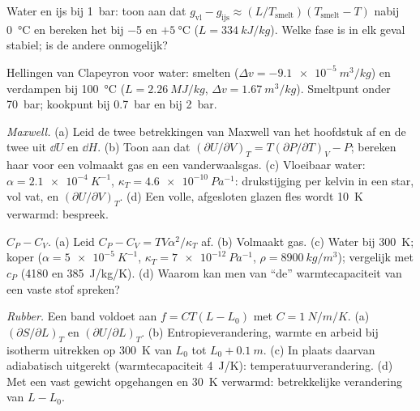 \begin{exercise}[$\star$]\label{exo:b2:thermodynamic-potentials:3}
Water en ijs bij \qty{1}{bar}: toon aan dat
$g_{\text{vl}} - g_{\text{ijs}} \approx
(L/T_{\text{smelt}})(T_{\text{smelt}} - T)$
nabij \qty{0}{\celsius} en bereken het
bij \qty{-5}{} en $+\qty{5}{\celsius}$ ($L = \qty{334}{kJ/kg}$). Welke fase is
in elk geval stabiel; is de andere onmogelijk?
\end{exercise}

\begin{exercise}[$\star$]\label{exo:b2:thermodynamic-potentials:4}
Hellingen van Clapeyron voor water: smelten ($\Delta v = -\qty{9.1e-5}{m^3/kg}$) en
verdampen bij \qty{100}{\celsius} ($L = \qty{2.26}{MJ/kg}$,
$\Delta v =
\qty{1.67}{m^3/kg}$). Smeltpunt onder \qty{70}{bar}; kookpunt
bij
\qty{0.7}{bar} en bij \qty{2}{bar}.
\end{exercise}

\begin{exercise}[$\star\star$]\label{exo:b2:thermodynamic-potentials:5}
\emph{Maxwell.} (a) Leid de twee betrekkingen van Maxwell van het hoofdstuk
af en de twee uit $\dd U$ en $\dd H$. (b) Toon aan dat
$(\partial U/\partial V)_T =
T(\partial P/\partial T)_V - P$; bereken haar
voor een volmaakt gas en een
vanderwaalsgas. (c) Vloeibaar water: $\alpha = \qty{2.1e-4}{K^{-1}}$,
$\kappa_T =
\qty{4.6e-10}{Pa^{-1}}$: drukstijging per kelvin in een star,
vol vat,
en $(\partial U/\partial V)_T$. (d) Een volle, afgesloten glazen fles wordt
\qty{10}{K} verwarmd: bespreek.
\end{exercise}

\begin{exercise}[$\star\star$]\label{exo:b2:thermodynamic-potentials:6}
\emph{$C_P - C_V$.} (a) Leid $C_P - C_V = TV\alpha^2/\kappa_T$ af. (b)
Volmaakt gas. (c) Water bij \qty{300}{K}; koper ($\alpha = \qty{5e-5}{K^{-1}}$,
$\kappa_T = \qty{7e-12}{Pa^{-1}}$, $\rho = \qty{8900}{kg/m^3}$); vergelijk met
$c_P$ (\qty{4180}{} en \qty{385}{J/kg/K}). (d) Waarom kan men van
``de'' warmtecapaciteit van een vaste stof spreken?
\end{exercise}

\begin{exercise}[$\star\star$]\label{exo:b2:thermodynamic-potentials:7}
\emph{Rubber.} Een band voldoet aan $f = CT(L - L_0)$ met $C = \qty{1}{N/m/K}$.
(a) $(\partial S/\partial L)_T$ en $(\partial U/\partial L)_T$. (b)
Entropie\-verandering,
warmte en arbeid bij isotherm uitrekken op \qty{300}{K} van
$L_0$ tot $L_0 + \qty{0.1}{m}$. (c) In plaats daarvan adiabatisch uitgerekt
(warmte\-capaciteit
\qty{4}{J/K}): temperatuurverandering. (d) Met een vast gewicht opgehangen
en \qty{30}{K} verwarmd: betrekkelijke verandering van $L - L_0$.
\end{exercise}


